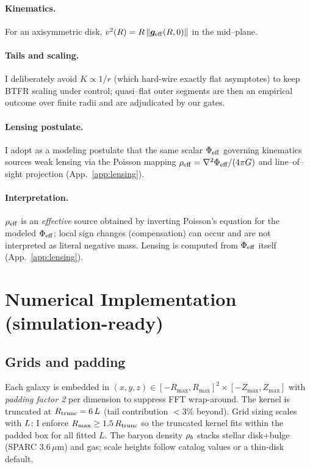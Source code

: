 		\paragraph{Kinematics.}
		For an axisymmetric disk, $v^2(R)=R\,\lVert\bm{g}_{\mathrm{eff}}(R,0)\rVert$ in the mid--plane.
		
		\paragraph{Tails and scaling.}
		I deliberately avoid $K\propto 1/r$ (which hard-wire exactly flat asymptotes) to keep BTFR scaling under control; quasi--flat outer segments are then an empirical outcome over finite radii and are adjudicated by our gates.
		

		
		\paragraph{Lensing postulate.}
		I adopt as a modeling postulate that the same scalar $\Phi_{\rm eff}$ governing kinematics sources weak lensing via the Poisson mapping $\rho_{\rm eff}=\nabla^2\Phi_{\rm eff}/(4\pi G)$ and line–of–sight projection (App.~\ref{app:lensing}).
		\paragraph{Interpretation.} $\rho_{\rm eff}$ is an \emph{effective} source obtained by inverting Poisson’s equation for the modeled $\Phi_{\rm eff}$; local sign changes (compensation) can occur and are not interpreted as literal negative mass. Lensing is computed from $\Phi_{\rm eff}$ itself (App.~\ref{app:lensing}).
		
		\section{Numerical Implementation (simulation-ready)}\label{sec:numerics}
		\subsection{Grids and padding}\label{subsec:grids}
		Each galaxy is embedded in $(x,y,z)\in[-R_{\max},R_{\max}]^2\times[-Z_{\max},Z_{\max}]$ with \emph{padding factor 2} per dimension to suppress FFT wrap-around. The kernel is truncated at $R_{\rm trunc}=6\,L$ (tail contribution $<3\%$ beyond). Grid sizing scales with $L$: I enforce $R_{\max}\ge 1.5\,R_{\rm trunc}$ so the truncated kernel fits within the padded box for all fitted $L$. The baryon density $\rho_b$ stacks stellar disk+bulge (SPARC $3.6\,\mu$m) and gas; scale heights follow catalog values or a thin-disk default.
		
